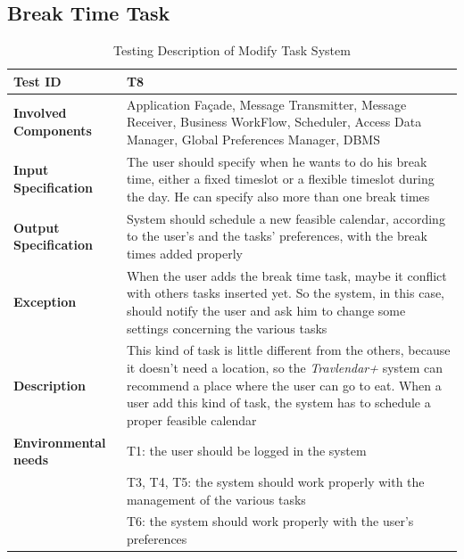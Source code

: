 \subsection*{Break Time Task}

\begin{table}[H]
    \centering
    \begin{tabular}{p{4.55cm} p{7cm}}
        
        \hline
        
        \textbf{Test ID}                & T8 \\
        
        \hline
        
        \textbf{Involved Components}    & Application Façade, Message Transmitter, Message Receiver, Business                                          WorkFlow, Scheduler, Access Data Manager, Global Preferences Manager,                                      DBMS\\
        
        \hline
        
        \textbf{Input Specification}    & The user should specify when he wants to do his break time, either a fixed timeslot or a flexible timeslot during the day. He can specify also more than one break times\\
        
        \hline
        
        \textbf{Output Specification}   & System should schedule a new feasible calendar, according to the user's and the tasks' preferences, with the break times added properly\\
        
        \hline
        
        \textbf{Exception}              & When the user adds the break time task, maybe it conflict with others tasks inserted yet. So the system, in this case, should notify the user and ask him to change some settings concerning the various tasks\\
        
        \hline
        
        \textbf{Description}            & This kind of task is little different from the others, because it doesn't need a location, so the \emph{Travlendar+} system can recommend a place where the user can go to eat. When a user add this kind of task, the system has to schedule a proper feasible calendar\\
        \hline
        
        \textbf{Environmental needs}    & T1: the user should be logged in the system\\
                                        & T3, T4, T5: the system should work properly with the management of the various tasks \\
                                        & T6: the system should work properly with the user's preferences \\
        
        \hline
        
    \end{tabular}
    \caption{Testing Description of Modify Task System}
    
\end{table}
